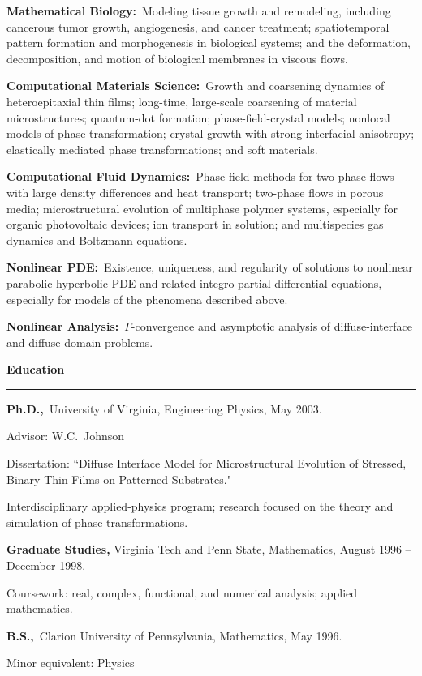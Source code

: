 \documentclass[10pt,letterpaper]{article}
\newcommand{\cvsection}[1]{%
  \Needspace{5\baselineskip}\par\vspace{13pt}%
  {\color{Smokey}\fontsize{15}{17}\selectfont\bfseries #1}\par\vspace{3pt}%
  {\color{UTOrange}\rule{\linewidth}{1.8pt}}\par\vspace{4pt}%
}
\begin{document}
\begin{description}
	\item
\textbf{Mathematical Biology:}~Modeling tissue growth and remodeling, including cancerous tumor growth, angiogenesis, and cancer treatment; spatiotemporal pattern formation and morphogenesis in biological systems; and the deformation, decomposition, and motion of biological membranes in viscous flows.
	\item
\textbf{Computational Materials Science:}~Growth and coarsening dynamics of heteroepitaxial thin films; long-time, large-scale coarsening of material microstructures; quantum-dot formation; phase-field-crystal models; nonlocal models of phase transformation; crystal growth with strong interfacial anisotropy; elastically mediated phase transformations; and soft materials.
	\item
\textbf{Computational Fluid Dynamics:}~Phase-field methods for two-phase flows with large density differences and heat transport; two-phase flows in porous media; microstructural evolution of multiphase polymer systems, especially for organic photovoltaic devices; ion transport in solution; and multispecies gas dynamics and Boltzmann equations.
	\item
\textbf{Nonlinear PDE:}~Existence, uniqueness, and regularity of solutions to nonlinear parabolic-hyperbolic PDE and related integro-partial differential equations, especially for models of the phenomena described above.
	\item
\textbf{Nonlinear Analysis:}~$\Gamma$-convergence and asymptotic analysis of diffuse-interface and diffuse-domain problems.
    \end{description}
	
	\smallskip
  
\cvsection{Education}
    \begin{description}
    \item
\textbf{Ph.D.,}~University of Virginia, Engineering Physics, May 2003.
    \begin{description}
    \item
Advisor: W.C.~Johnson
    \item
Dissertation: ``Diffuse Interface Model for Microstructural Evolution of Stressed, Binary Thin Films on Patterned Substrates."
    \item
Interdisciplinary applied-physics program; research focused on the theory and simulation of phase transformations.
    \end{description}
    \item
 \textbf{Graduate Studies,} Virginia Tech and Penn State, Mathematics, August 1996 -- December 1998.
    \begin{description}
    \item
Coursework: real, complex, functional, and numerical analysis; applied mathematics.
    \end{description}
    \item
\textbf{B.S.,}~Clarion University of Pennsylvania, Mathematics, May
1996.
    \begin{description}
    \item
Minor equivalent: Physics
    \end{description}
    \end{description}
	
\end{document}
